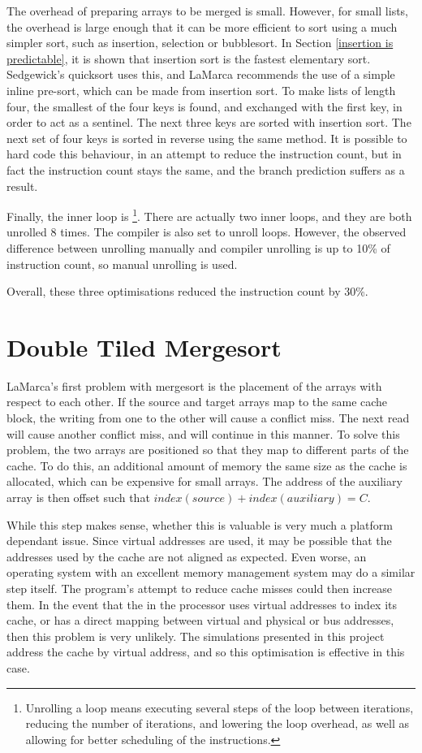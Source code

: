 The overhead of preparing arrays to be merged is small. However, for small
lists, the overhead is large enough that it can be more efficient to sort using
a much simpler sort, such as insertion, selection or bubblesort. In Section
\ref{insertion is predictable}, it is shown that insertion sort is the fastest
elementary sort.  Sedgewick's quicksort uses this, and LaMarca recommends the
use of a simple inline pre-sort, which can be made from insertion sort. To make
lists of length four, the smallest of the four keys is found, and exchanged
with the first key, in order to act as a sentinel. The next three keys are
sorted with insertion sort. The next set of four keys is sorted in reverse
using the same method. It is possible to hard code this behaviour, in an attempt
to reduce the instruction count, but in fact the instruction count stays the
same, and the branch prediction suffers as a result.

Finally, the inner loop is \footnote{Unrolling a loop means
executing several steps of the loop between iterations, reducing the number of
iterations, and lowering the loop overhead, as well as allowing for better
scheduling of the instructions.}.  There are actually two inner loops, and they
are both unrolled 8 times. The compiler is also set to unroll loops. However,
the observed difference between unrolling manually and compiler unrolling is up
to 10\% of instruction count, so manual unrolling is used.

Overall, these three optimisations reduced the instruction count by 30\%.

\section{Double Tiled Mergesort}
LaMarca's first problem with mergesort is the placement of the arrays with
respect to each other. If the source and target arrays map to the same cache
block, the writing from one to the other will cause a conflict miss. The next
read will cause another conflict miss, and will continue in this manner. To
solve this problem, the two arrays are positioned so that they map to different
parts of the cache. To do this, an additional amount of memory the same size as
the cache is allocated, which can be expensive for small arrays. The address of
the auxiliary array is then offset such that $index(source) + index(auxiliary) =
C$.

While this step makes sense, whether this is valuable is very much a platform
dependant issue. Since virtual addresses are used, it may be possible that the
addresses used by the cache are not aligned as expected. Even worse, an
operating system with an excellent memory management system may do a similar
step itself. The program's attempt to reduce cache misses could then increase
them. In the event that the  in the processor uses
virtual addresses to index its cache, or has a direct mapping between virtual
and physical or bus addresses, then this problem is very unlikely. The
simulations presented in this project address the cache by virtual address, and
so this optimisation is effective in this case.

